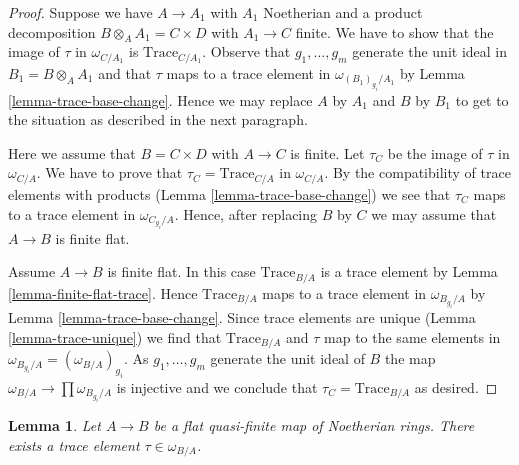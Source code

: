 \documentclass{stacks-project}
\theoremstyle{plain}
\newtheorem{lemma}[subsection]{Lemma}
\theoremstyle{definition}
\theoremstyle{remark}
\numberwithin{equation}{subsection}
\begin{document}
\begin{proof}
Suppose we have $A \to A_1$ with $A_1$ Noetherian and a product
decomposition $B \otimes_A A_1 = C \times D$ with $A_1 \to C$ finite.
We have to show that the image of $\tau$ in $\omega_{C/A_1}$ is
$\text{Trace}_{C/A_1}$. Observe that $g_1, \ldots, g_m$
generate the unit ideal in $B_1 = B \otimes_A A_1$ and that
$\tau$ maps to a trace element in $\omega_{(B_1)_{g_i}/A_1}$
by Lemma \ref{lemma-trace-base-change}. Hence we may replace
$A$ by $A_1$ and $B$ by $B_1$ to get to the situation as described
in the next paragraph.

\medskip\noindent
Here we assume that $B = C \times D$ with $A \to C$ is finite.
Let $\tau_C$ be the image of $\tau$ in $\omega_{C/A}$.
We have to prove that $\tau_C = \text{Trace}_{C/A}$ in $\omega_{C/A}$.
By the compatibility of trace elements with products
(Lemma \ref{lemma-trace-base-change})
we see that $\tau_C$ maps to a trace element in $\omega_{C_{g_i}/A}$.
Hence, after replacing $B$ by $C$ we may assume that $A \to B$
is finite flat.

\medskip\noindent
Assume $A \to B$ is finite flat. In this case $\text{Trace}_{B/A}$
is a trace element by Lemma \ref{lemma-finite-flat-trace}.
Hence $\text{Trace}_{B/A}$ maps to a trace element in
$\omega_{B_{g_i}/A}$ by Lemma \ref{lemma-trace-base-change}.
Since trace elements are unique (Lemma \ref{lemma-trace-unique})
we find that $\text{Trace}_{B/A}$ and $\tau$ map
to the same elements in $\omega_{B_{g_i}/A} = (\omega_{B/A})_{g_i}$.
As $g_1, \ldots, g_m$ generate the unit ideal of $B$ the map
$\omega_{B/A} \to \prod \omega_{B_{g_i}/A}$ is injective
and we conclude that $\tau_C = \text{Trace}_{B/A}$ as desired.
\end{proof}

\begin{lemma}
\label{lemma-dualizing-tau}
Let $A \to B$ be a flat quasi-finite map of Noetherian rings.
There exists a trace element $\tau \in \omega_{B/A}$.
\end{lemma}
\end{document}
